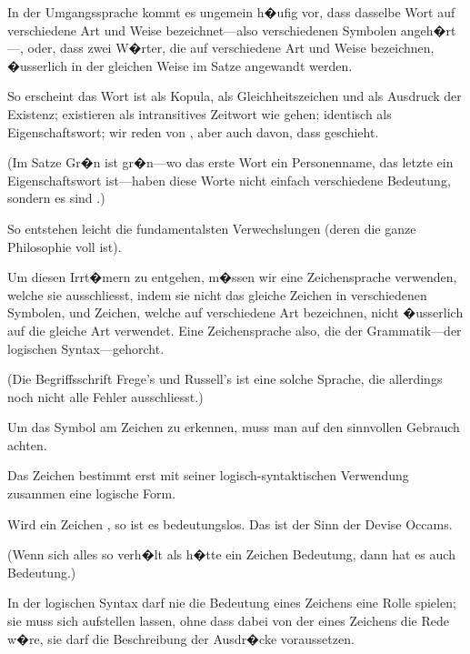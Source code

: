 \begin{propositions}
{In der Umgangssprache kommt es ungemein
h�ufig vor, dass dasselbe Wort auf verschiedene
Art und Weise bezeichnet---also verschiedenen
Symbolen an\-ge\-h�rt---, oder, dass zwei W�rter,
die auf verschiedene Art und Weise bezeichnen,
�usserlich in der gleichen Weise im Satze angewandt
werden.

So erscheint das Wort \glqq{}ist\grqq{} als Kopula, als
Gleichheitszeichen und als Ausdruck der Existenz;
\glqq{}existieren\grqq{} als intransitives Zeitwort wie \glqq{}gehen\grqq{};
\glqq{}identisch\grqq{} als Eigenschaftswort; wir reden von
, aber auch davon, dass  geschieht.

(Im Satze \glqq{}Gr�n ist gr�n\grqq{}---wo das erste Wort
ein Personenname, das letzte ein Eigenschaftswort
ist---haben diese Worte nicht einfach verschiedene
Bedeutung, sondern es sind .)}


{So entstehen leicht die fundamentalsten Verwechslungen
(deren die ganze Philosophie voll
ist).}


{Um diesen Irrt�mern zu entgehen, m�ssen
wir eine Zeichensprache verwenden, welche sie
ausschliesst, indem sie nicht das gleiche Zeichen
in verschiedenen Symbolen, und Zeichen, welche
auf verschiedene Art bezeichnen, nicht �usserlich
auf die gleiche Art verwendet. Eine Zeichensprache
also, die der  Grammatik---der logischen
Syntax---gehorcht.

(Die Begriffsschrift Frege's und Russell's ist
eine solche Sprache, die allerdings noch nicht alle
Fehler ausschliesst.)}


{Um das Symbol am Zeichen zu erkennen, muss
man auf den sinnvollen Gebrauch achten.}


{Das Zeichen bestimmt erst mit seiner logisch-syntaktischen
Verwendung zusammen eine logische
Form.}


{Wird ein Zeichen , so ist
es bedeutungslos. Das ist der Sinn der Devise
Occams.

(Wenn sich alles so verh�lt als h�tte ein Zeichen
Bedeutung, dann hat es auch Bedeutung.)}


{In der logischen Syntax darf nie die Bedeutung
eines Zeichens eine Rolle spielen; sie muss sich
aufstellen lassen, ohne dass dabei von der 
eines Zeichens die Rede w�re, sie darf 
die Beschreibung der Ausdr�cke voraussetzen.}



\end{propositions}
